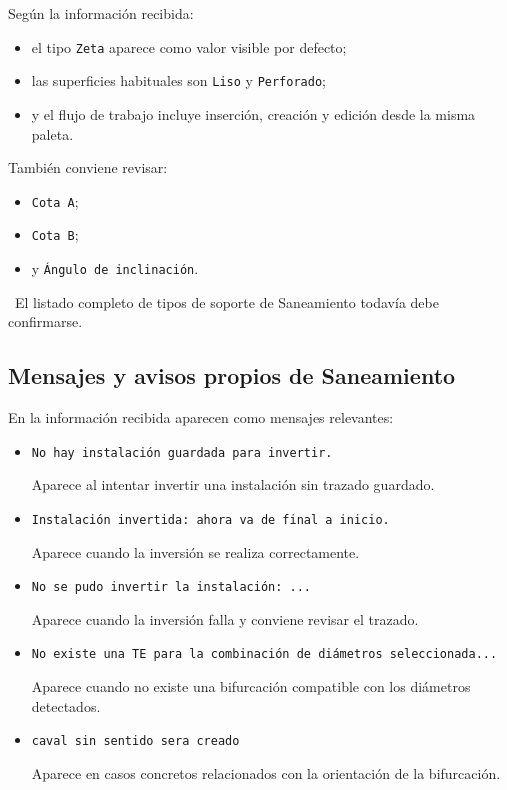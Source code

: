 Según la información recibida:

\begin{itemize}
\item el tipo \texttt{Zeta} aparece como valor visible por defecto;
\item las superficies habituales son \texttt{Liso} y \texttt{Perforado};
\item y el flujo de trabajo incluye inserción, creación y edición desde la misma paleta.
\end{itemize}

También conviene revisar:

\begin{itemize}
\item \texttt{Cota A};
\item \texttt{Cota B};
\item y \texttt{Ángulo de inclinación}.
\end{itemize}

\pendingtag\ El listado completo de tipos de soporte de Saneamiento todavía debe confirmarse.


\subsection{Mensajes y avisos propios de Saneamiento}

En la información recibida aparecen como mensajes relevantes:

\begin{itemize}
\item \texttt{No hay instalación guardada para invertir.}

Aparece al intentar invertir una instalación sin trazado guardado.

\item \texttt{Instalación invertida: ahora va de final a inicio.}

Aparece cuando la inversión se realiza correctamente.

\item \texttt{No se pudo invertir la instalación: ...}

Aparece cuando la inversión falla y conviene revisar el trazado.

\item \texttt{No existe una TE para la combinación de diámetros seleccionada...}

Aparece cuando no existe una bifurcación compatible con los diámetros detectados.

\item \texttt{caval sin sentido sera creado}

Aparece en casos concretos relacionados con la orientación de la bifurcación.
\end{itemize}

